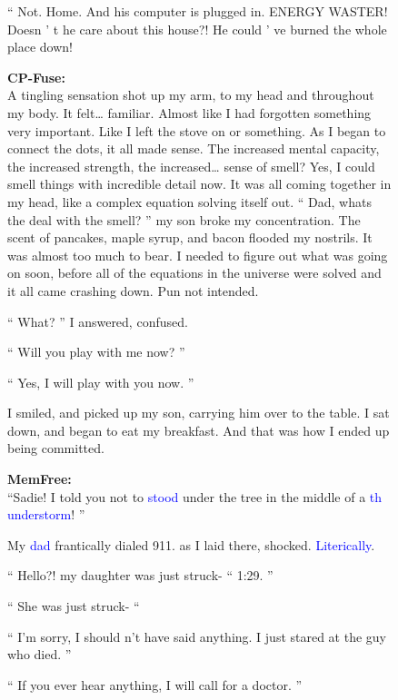 \begin{figure}[!htbp]
\begin{mdframed}
\begin{minipage}[t]{\textwidth}
 “ Not. Home. And his computer is plugged in. ENERGY WASTER! Doesn ’ t he care about this house?! He could ’ ve burned the whole place down! \\
    \end{minipage}
    \vspace{10pt}
    \begin{minipage}[t]{\textwidth}
        \textbf{CP-Fuse:} \\
A tingling sensation shot up my arm, to my head and throughout my body. It felt… familiar. Almost like I had forgotten something very important. Like I left the stove on or something. As I began to connect the dots, it all made sense. The increased mental capacity, the increased strength, the increased… sense of smell? Yes, I could smell things with incredible detail now. It was all coming together in my head, like a complex equation solving itself out. 
 “ Dad, whats the deal with the smell? ” my son broke my concentration. The scent of pancakes, maple syrup, and bacon flooded my nostrils. It was almost too much to bear. I needed to figure out what was going on soon, before all of the equations in the universe were solved and it all came crashing down. Pun not intended. 
 
 “ What? ” I answered, confused. 
 
 “ Will you play with me now? ” 
 
 “ Yes, I will play with you now. ” 
 
 I smiled, and picked up my son, carrying him over to the table. I sat down, and began to eat my breakfast. And that was how I ended up being committed. \end{minipage}
 \vspace{10pt}
    \begin{minipage}[t]{\textwidth}
        \textbf{MemFree:} \\
 ``Sadie! I told you not to \textcolor{blue}{stood} under the tree in the middle of a \textcolor{blue}{th understorm}! ” 
 
 My \textcolor{blue}{dad} frantically dialed 911. as I laid there, shocked. \textcolor{blue}{Literically}. 
 
 “ Hello?! my daughter was just struck- “ 
 1:29. ” 
 
 “ She was just struck- “ 
 
 “ I'm sorry, I should n't have said anything. I just stared at the guy who died. ” 
 
 “ If you ever hear anything, I will call for a doctor. ” 
 

\end{minipage}
\end{mdframed}
\end{figure}
